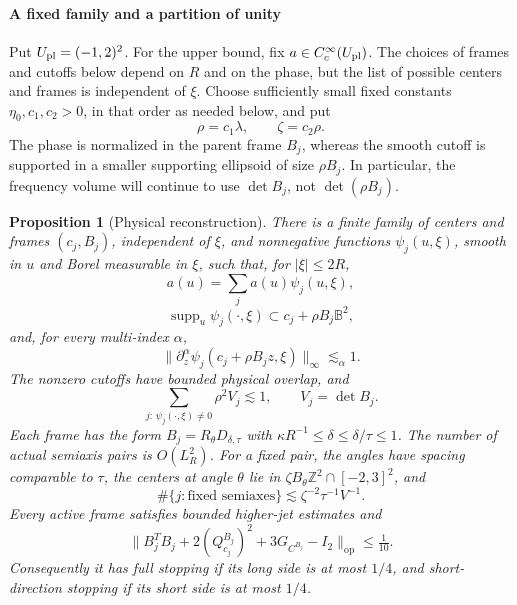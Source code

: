 \documentclass[11pt]{amsart}
\newtheorem{proposition}[theorem]{Proposition}
\theoremstyle{definition}
\theoremstyle{remark}
\numberwithin{equation}{section}
\begin{document}
\paragraph{A fixed family and a partition of unity}
\label{pl:physical-partition}

Put $U_{\rm pl}=(-1,2)^2$. For the upper bound, fix $a\in C_c^\infty(U_{\rm pl})$. The choices of frames and cutoffs below depend on $R$ and on the phase, but the list of possible centers and frames is independent of $\xi$. Choose sufficiently small fixed constants $\eta_0,c_1,c_2>0$, in that order as needed below, and put
\begin{equation}\label{pl:carrier-scales}
\rho=c_1\lambda,\qquad \zeta=c_2\rho.
\end{equation}
The phase is normalized in the parent frame $B_j$, whereas the smooth cutoff is supported in a smaller supporting ellipsoid of size $\rho B_j$. In particular, the frequency volume will continue to use $\det B_j$, not $\det(\rho B_j)$.

\begin{proposition}[Physical reconstruction]\label{pl:physical-reconstruction}
There is a finite family of centers and frames $(c_j,B_j)$, independent of $\xi$, and nonnegative functions $\psi_j(u,\xi)$, smooth in $u$ and Borel measurable in $\xi$, such that, for $|\xi|\le2R$,
\begin{equation}\label{pl:physical-identity}
a(u)=\sum_j a(u)\psi_j(u,\xi),
\end{equation}
\begin{equation}\label{pl:carrier-support}
\operatorname{supp}_u\psi_j(\cdot,\xi)\subset c_j+\rho B_j\mathbb B^2,
\end{equation}
and, for every multi-index $\alpha$,
\begin{equation}\label{pl:cutoff-derivatives}
\bigl\|\partial_z^\alpha\psi_j(c_j+\rho B_jz,\xi)\bigr\|_\infty\lesssim_\alpha 1.
\end{equation}
The nonzero cutoffs have bounded physical overlap, and
\begin{equation}\label{pl:physical-volume-sum}
\sum_{j:\,\psi_j(\cdot,\xi)\ne0}\rho^2V_j\lesssim1,
\qquad V_j=\det B_j.
\end{equation}
Each frame has the form $B_j=R_\theta D_{\delta,\tau}$ with $\kappa R^{-1}\le\delta\le\delta/\tau\le1$. The number of actual semiaxis pairs is $O(L_R^2)$. For a fixed pair, the angles have spacing comparable to $\tau$, the centers at angle $\theta$ lie in $\zeta B_\theta\mathbb Z^2\cap[-2,3]^2$, and
\begin{equation}\label{pl:library-count}
\#\{j:\text{fixed semiaxes}\}\lesssim\zeta^{-2}\tau^{-1}V^{-1}.
\end{equation}
Every active frame satisfies bounded higher-jet estimates and
\begin{equation}\label{pl:library-balance}
\bigl\|B_j^TB_j+2(Q_{c_j}^{B_j})^2+3G_{C^{B_j}}-I_2\bigr\|_{\mathrm{op}}\le\tfrac1{10}.
\end{equation}
Consequently it has full stopping if its long side is at most $1/4$, and short-direction stopping if its short side is at most $1/4$.
\end{proposition}
\end{document}
